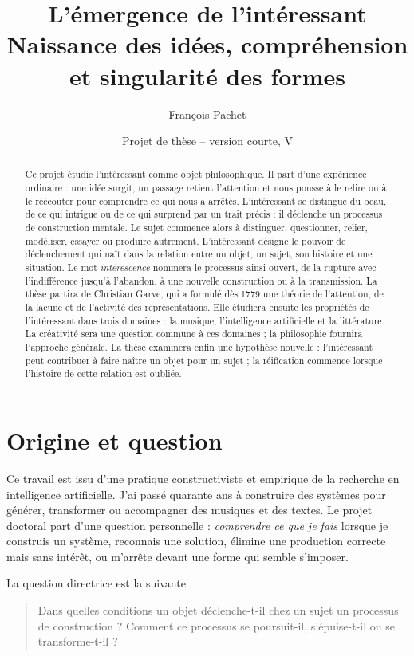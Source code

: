 \documentclass[11pt,a4paper]{article}
\title{L'émergence de l'intéressant\\
\large Naissance des idées, compréhension et singularité des formes}
\author{François Pachet}
\date{Projet de thèse -- version courte, V\projectversion\\\small \projectdate}
\begin{document}
\maketitle

\begin{abstract}
Ce projet étudie l'intéressant comme objet philosophique. Il part d'une
expérience ordinaire : une idée surgit, un passage retient l'attention et nous
pousse à le relire ou à le réécouter pour comprendre ce qui nous a arrêtés.
L'intéressant se distingue du beau, de ce qui intrigue ou de ce qui surprend
par un trait précis : il déclenche un processus de construction mentale. Le
sujet commence alors à
distinguer, questionner, relier, modéliser, essayer ou produire autrement.
L'intéressant désigne le pouvoir de déclenchement qui naît dans la relation
entre un objet, un sujet, son histoire et une situation. Le mot
\emph{intérescence} nommera le processus ainsi ouvert, de la rupture avec
l'indifférence jusqu'à l'abandon, à une nouvelle construction ou à la
transmission. La thèse partira de Christian Garve, qui a formulé dès 1779 une
théorie de l'attention, de la lacune et de l'activité des représentations. Elle
étudiera ensuite les propriétés de l'intéressant dans trois domaines : la
musique, l'intelligence artificielle et la littérature. La créativité sera une
question commune à ces domaines ; la philosophie fournira l'approche générale.
La thèse examinera enfin une hypothèse nouvelle : l'intéressant peut contribuer à faire
naître un objet pour un sujet ; la réification commence lorsque l'histoire de
cette relation est oubliée.
\end{abstract}

\section{Origine et question}

Ce travail est issu d'une pratique constructiviste et empirique de la recherche
en intelligence artificielle. J'ai passé quarante ans à construire des systèmes
pour générer, transformer ou accompagner des musiques et des textes. Le projet
doctoral part d'une question personnelle : \emph{comprendre ce que je fais}
lorsque je construis un système, reconnais une solution, élimine une production
correcte mais sans intérêt, ou m'arrête devant une forme qui semble s'imposer.

La question directrice est la suivante :

\begin{quote}
Dans quelles conditions un objet déclenche-t-il chez un sujet un processus de
construction ? Comment ce processus se poursuit-il, s'épuise-t-il ou se
transforme-t-il ?
\end{quote}
\end{document}
